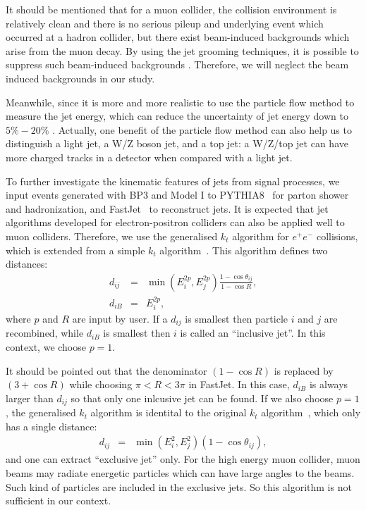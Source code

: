 \documentclass[a4paper,11pt]{article}
\begin{document}
It should be mentioned that for a muon collider, 
the collision environment is relatively clean and there is no serious pileup and underlying event which occurred at a hadron collider, 
but there exist beam-induced backgrounds which arise from the muon decay. 
By using the jet grooming techniques, 
it is possible to suppress such beam-induced backgrounds \cite{Collamati:2021sbv}. 
Therefore, we will neglect the beam induced backgrounds in our study.

Meanwhile, since it is more and more realistic to use the particle flow method to measure the jet energy, 
which can reduce the uncertainty of jet energy down to $5\%-20\%$ \cite{Nachman:2022emq}. 
Actually, one benefit of the particle flow method can also help us to distinguish a light jet, 
a W/Z boson jet, and a top jet: a W/Z/top jet can have more charged tracks in a detector when compared with a light jet.

To further investigate the kinematic features of jets from signal processes, 
we input events generated with BP3 and Model I to PYTHIA8~\cite{Bierlich:2022pfr} for parton shower and hadronization, 
and FastJet~\cite{Cacciari:2011ma} to reconstruct jets.  
It is expected that jet algorithms developed for electron-positron colliders can also be applied well to muon colliders. 
Therefore, we use the generalised $k_t$ algorithm for $e^+e^-$ collisions,
which is extended from a simple $k_t$ algorithm~\cite{Catani:1991hj}.
This algorithm defines two distances:
\begin{eqnarray}
  d_{ij} &=& \min(E^{2p}_i,E^{2p}_j)\frac{1-\cos\theta_{ij}}{1-\cos{R}}, \label{eq:genkt1}\\
  d_{iB} &=& E^{2p}_i, \label{eq:genkt2}
\end{eqnarray}
where $p$ and $R$ are input by user. 
If a $d_{ij}$ is smallest then particle $i$ and $j$ are recombined, 
while $d_{iB}$ is smallest then $i$ is called an ``inclusive jet''.
In this context, we choose $p=1$.

It should be pointed out that the denominator $(1-\cos{R})$ is replaced by $(3+\cos{R})$ while choosing $\pi<R<3\pi$ in FastJet.
In this case, $d_{iB}$ is always larger than $d_{ij}$ so that only one inlcusive jet can be found.  
If we also choose $p=1$, the generalised $k_t$ algorithm is identital to the original $k_t$ algorithm~\cite{Catani:1991hj}, 
which only has a single distance:
\begin{eqnarray}
  d_{ij} &=& \min(E^{2}_i,E^{2}_j)\left(1-\cos\theta_{ij}\right), \label{eq:eekt}
\end{eqnarray}
and one can extract ``exclusive jet'' only. 
For the high energy muon collider, muon beams may radiate energetic particles which can have large angles to the beams. 
Such kind of particles are included in the exclusive jets. 
So this algorithm is not sufficient in our context.
\end{document}
